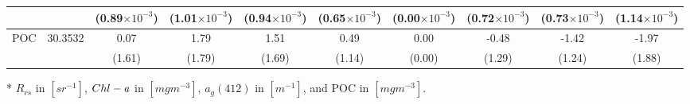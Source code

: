 \documentclass[preview]{standalone}
\begin{document}
\begin{threeparttable}
\begin{tabular}{cccccccccc}
			  &						&	 (0.89$\times10^{-3}$)	&  	(1.01$\times10^{-3}$) 	&   (0.94$\times10^{-3}$) 	&   (0.65$\times10^{-3}$) 	&   (0.00$\times10^{-3}$) 	&   (0.72$\times10^{-3}$) 	&   (0.73$\times10^{-3}$) 	&   (1.14$\times10^{-3}$) 	\\ \hline
POC		      & 30.3532 			&	  0.07 					&    1.79 					&    1.51 					&    0.49 					&    0.00 					&   -0.48 					&   -1.42 					&   -1.97 					\\ 
			  &						&	  (1.61) 				&   (1.79) 					&   (1.69) 					&   (1.14) 					&   (0.00) 					&   (1.29) 					&   (1.24) 					&   (1.88) 					\\ \hline

\end{tabular}
\begin{tablenotes}\tiny
\item [*] $R_{rs}$ in $[sr^{-1}]$, $Chl-\it{a}$ in $[mg m^{-3}]$, $a_{g}(412)$ in $[m^{-1}]$, and POC in $[mg m^{-3}]$.
\end{tablenotes}
\end{threeparttable}
\end{document}

